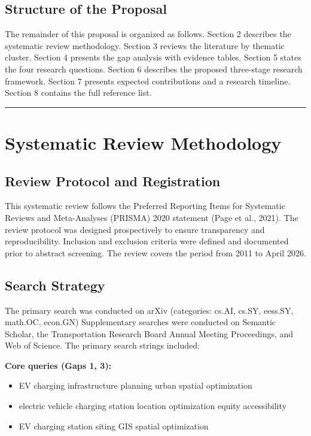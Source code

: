 \documentclass[letterpaper, 12pt, oneside, doublespacing]{Thesis}
\begin{document}
\section{Structure of the Proposal}

The remainder of this proposal is organized as follows. Section 2 describes the systematic review methodology. Section 3 reviews the literature by thematic cluster. Section 4 presents the gap analysis with evidence tables. Section 5 states the four research questions. Section 6 describes the proposed three-stage research framework. Section 7 presents expected contributions and a research timeline. Section 8 contains the full reference list.


\bigskip\noindent\rule{\linewidth}{0.4pt}\bigskip


\chapter{Systematic Review Methodology}

\section{Review Protocol and Registration}

This systematic review follows the Preferred Reporting Items for Systematic Reviews and Meta-Analyses (PRISMA) 2020 statement (Page et al., 2021). The review protocol was designed prospectively to ensure transparency and reproducibility. Inclusion and exclusion criteria were defined and documented prior to abstract screening. The review covers the period from 2011 to April 2026.

\section{Search Strategy}

The primary search was conducted on arXiv (categories: cs.AI, cs.SY, eess.SY, math.OC, econ.GN) Supplementary searches were conducted on Semantic Scholar, the Transportation Research Board Annual Meeting Proceedings, and Web of Science. The primary search strings included:


\noindent \textbf{Core queries (Gaps 1, 3):}

\begin{itemize}
  \item EV charging infrastructure planning urban spatial optimization
  \item electric vehicle charging station location optimization equity accessibility
  \item EV charging station siting GIS spatial optimization
\end{itemize}
\end{document}

